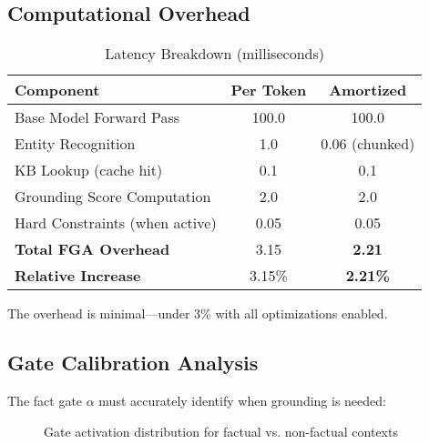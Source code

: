 \documentclass[11pt, a4paper]{article}
\theoremstyle{definition}
\begin{document}
\subsection{Computational Overhead}

\begin{table}[h]
\centering
\caption{Latency Breakdown (milliseconds)}
\begin{tabular}{lcc}
\toprule
\textbf{Component} & \textbf{Per Token} & \textbf{Amortized} \\
\midrule
Base Model Forward Pass & 100.0 & 100.0 \\
Entity Recognition & 1.0 & 0.06 (chunked) \\
KB Lookup (cache hit) & 0.1 & 0.1 \\
Grounding Score Computation & 2.0 & 2.0 \\
Hard Constraints (when active) & 0.05 & 0.05 \\
\midrule
\textbf{Total FGA Overhead} & 3.15 & \textbf{2.21} \\
\textbf{Relative Increase} & 3.15\% & \textbf{2.21\%} \\
\bottomrule
\end{tabular}
\end{table}

The overhead is minimal—under 3\% with all optimizations enabled.

\subsection{Gate Calibration Analysis}

The fact gate $\alpha$ must accurately identify when grounding is needed:

\begin{figure}[h]
\centering
{}
\caption{Gate activation distribution for factual vs. non-factual contexts}
\end{figure}
\end{document}
